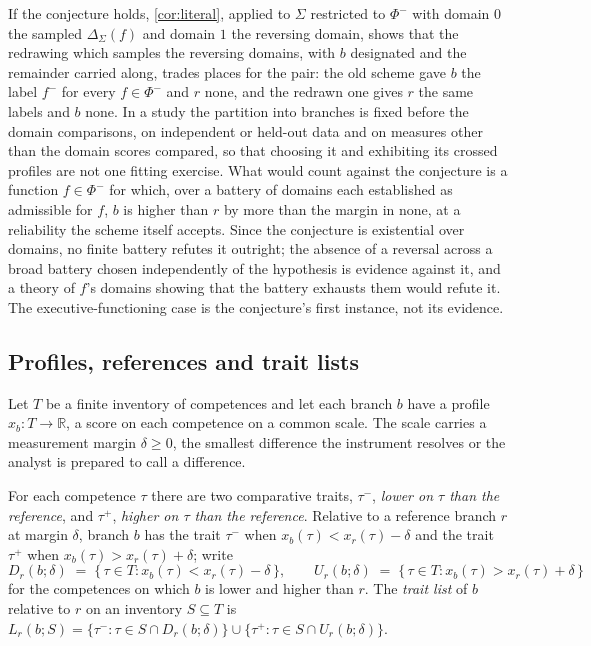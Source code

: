 \noindent If the conjecture holds, \autoref{cor:literal}, applied to $\Sigma$ restricted to $\Phi^{-}$ with domain $0$ the sampled $\Delta_\Sigma(f)$ and domain $1$ the reversing domain, shows that the redrawing which samples the reversing domains, with $b$ designated and the remainder carried along, trades places for the pair: the old scheme gave $b$ the label $f^{-}$ for every $f \in \Phi^{-}$ and $r$ none, and the redrawn one gives $r$ the same labels and $b$ none. In a study the partition into branches is fixed before the domain comparisons, on independent or held-out data and on measures other than the domain scores compared, so that choosing it and exhibiting its crossed profiles are not one fitting exercise. What would count against the conjecture is a function $f \in \Phi^{-}$ for which, over a battery of domains each established as admissible for $f$, $b$ is higher than $r$ by more than the margin in none, at a reliability the scheme itself accepts. Since the conjecture is existential over domains, no finite battery refutes it outright; the absence of a reversal across a broad battery chosen independently of the hypothesis is evidence against it, and a theory of $f$'s domains showing that the battery exhausts them would refute it. The executive-functioning case is the conjecture's first instance, not its evidence.

\subsection{Profiles, references and trait lists}
\label{sec:comparative}

Let $T$ be a finite inventory of competences and let each branch $b$ have a profile $x_b \colon T \to \mathbb{R}$, a score on each competence on a common scale. The scale carries a measurement margin $\delta \ge 0$, the smallest difference the instrument resolves or the analyst is prepared to call a difference.

\begin{definition}
\label{def:deficit}
For each competence $\tau$ there are two comparative traits, $\tau^{-}$, \emph{lower on $\tau$ than the reference}, and $\tau^{+}$, \emph{higher on $\tau$ than the reference}. Relative to a reference branch $r$ at margin $\delta$, branch $b$ has the trait $\tau^{-}$ when $x_b(\tau) < x_r(\tau) - \delta$ and the trait $\tau^{+}$ when $x_b(\tau) > x_r(\tau) + \delta$; write
\[ D_r(b;\delta) \;=\; \{\, \tau \in T : x_b(\tau) < x_r(\tau) - \delta \,\}, \qquad U_r(b;\delta) \;=\; \{\, \tau \in T : x_b(\tau) > x_r(\tau) + \delta \,\} \]
for the competences on which $b$ is lower and higher than $r$. The \emph{trait list} of $b$ relative to $r$ on an inventory $S \subseteq T$ is $L_r(b; S) = \{\tau^{-} : \tau \in S \cap D_r(b;\delta)\} \cup \{\tau^{+} : \tau \in S \cap U_r(b;\delta)\}$.
\end{definition}


